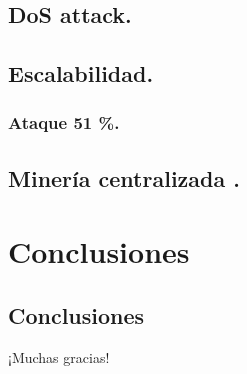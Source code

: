 \documentclass[usenames,dvipsnames]{beamer}
\begin{document}
\subsection{ DoS attack. }
\subsection{ Escalabilidad. }
\subsubsection{ Ataque 51 \%. }
\subsection{ Minería centralizada .}

\section{Conclusiones}
\subsection{Conclusiones}
\begin{frame}[standout]
  ¡Muchas gracias!
\end{frame}
\end{document}
